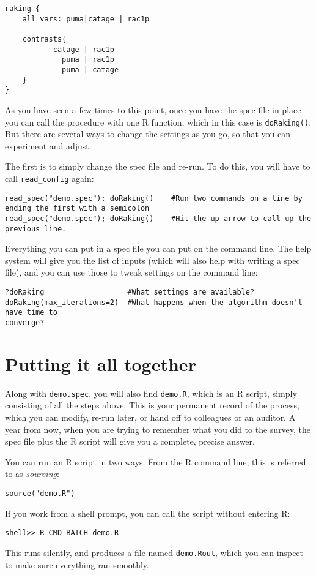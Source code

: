 \documentclass{article}
\begin{document}
\begin{specbit} 
\begin{verbatim}
raking {
	all_vars: puma|catage | rac1p

	contrasts{
		   catage | rac1p
			 puma | rac1p
			 puma | catage
	}
}
\end{verbatim}
\end{specbit} 

As you have seen a few times to this point, once you have the spec file in place you can
call the procedure with one R function, which in this case is {\tt doRaking()}. But there
are several ways to change the settings as you go, so that you can experiment and adjust.

The first is to simply change the spec file and re-run. To do this, you will have to call
{\tt read\_config} again:
\begin{rcode} 
\begin{verbatim}
read_spec("demo.spec"); doRaking()    #Run two commands on a line by ending the first with a semicolon
read_spec("demo.spec"); doRaking()    #Hit the up-arrow to call up the previous line.
\end{verbatim}
\end{rcode} 

Everything you can put in a spec file you can put on the command line. The help system
will give you the list of inputs (which will also help with writing a spec file), and you
can use those to tweak settings on the command line:
\begin{rcode} 
\begin{verbatim}
?doRaking                   #What settings are available?
doRaking(max_iterations=2)  #What happens when the algorithm doesn't have time to
converge?
\end{verbatim}
\end{rcode} 

\section{Putting it all together}
Along with {\tt demo.spec}, you will also find {\tt demo.R}, which is an R
script, simply consisting of all the steps above. This is your permanent record
of the process, which you can modify, re-run later, or hand off to colleagues or
an auditor. A year from now, when you are trying to remember what you did to the survey,
the spec file plus the R script will give you a complete, precise answer.

You can run an R script in two ways. From the R command line, this is referred to as
{\em sourcing}:
\begin{rcode} 
\begin{verbatim}
source("demo.R")
\end{verbatim}
\end{rcode} 

If you work from a shell prompt, you can call the script without entering R:
\begin{rcode} 
\begin{verbatim}
shell>> R CMD BATCH demo.R
\end{verbatim}
\end{rcode} 
This runs silently, and produces a file named {\tt demo.Rout}, which you can
inspect to make sure everything ran smoothly.
\end{document}
